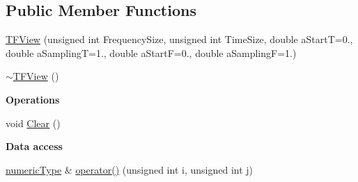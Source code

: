 \subsection*{Public Member Functions}
\begin{DoxyCompactItemize}
\item 
\hyperlink{classtsa_1_1_t_f_view_a03015be7d08c3aa9ac9fa82210706990}{T\+F\+View} (unsigned int Frequency\+Size, unsigned int Time\+Size, double a\+StartT=0., double a\+SamplingT=1., double a\+StartF=0., double a\+SamplingF=1.)
\item 
\hyperlink{classtsa_1_1_t_f_view_abdab74797261823f5f66dc8faf53373f}{$\sim$\+T\+F\+View} ()
\end{DoxyCompactItemize}
\begin{Indent}\textbf{ Operations}\par
\begin{DoxyCompactItemize}
\item 
void \hyperlink{classtsa_1_1_t_f_view_a5c152e1753388d15dae7215ec9951595}{Clear} ()
\end{DoxyCompactItemize}
\end{Indent}
\begin{Indent}\textbf{ Data access}\par
\begin{DoxyCompactItemize}
\item 
\hyperlink{classtsa_1_1_t_f_view_a9dcd740f5d29edefd0a181917a9c700b}{numeric\+Type} \& \hyperlink{classtsa_1_1_t_f_view_a6f20d608542849e71c31a1abd56a92a6}{operator()} (unsigned int i, unsigned int j)
\end{DoxyCompactItemize}
\end{Indent}
